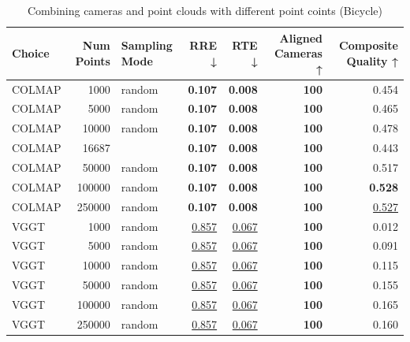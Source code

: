 \begin{table}[H]
\caption{Combining cameras and point clouds with different point coints (Bicycle)}
\label{tab:07_combined_num_points_bicycle}
\begin{tabular}{lrlrrrr}
\toprule
Choice & Num Points & Sampling Mode & RRE ↓ & RTE ↓ & Aligned Cameras ↑ & Composite Quality ↑ \\
\midrule
COLMAP & 1000 & random & \textbf{0.107} & \textbf{0.008} & \textbf{100} & 0.454 \\
COLMAP & 5000 & random & \textbf{0.107} & \textbf{0.008} & \textbf{100} & 0.465 \\
COLMAP & 10000 & random & \textbf{0.107} & \textbf{0.008} & \textbf{100} & 0.478 \\
COLMAP & 16687 &  & \textbf{0.107} & \textbf{0.008} & \textbf{100} & 0.443 \\
COLMAP & 50000 & random & \textbf{0.107} & \textbf{0.008} & \textbf{100} & 0.517 \\
COLMAP & 100000 & random & \textbf{0.107} & \textbf{0.008} & \textbf{100} & \textbf{0.528} \\
COLMAP & 250000 & random & \textbf{0.107} & \textbf{0.008} & \textbf{100} & \underline{0.527} \\
VGGT & 1000 & random & \underline{0.857} & \underline{0.067} & \textbf{100} & 0.012 \\
VGGT & 5000 & random & \underline{0.857} & \underline{0.067} & \textbf{100} & 0.091 \\
VGGT & 10000 & random & \underline{0.857} & \underline{0.067} & \textbf{100} & 0.115 \\
VGGT & 50000 & random & \underline{0.857} & \underline{0.067} & \textbf{100} & 0.155 \\
VGGT & 100000 & random & \underline{0.857} & \underline{0.067} & \textbf{100} & 0.165 \\
VGGT & 250000 & random & \underline{0.857} & \underline{0.067} & \textbf{100} & 0.160 \\
\bottomrule
\end{tabular}
\end{table}
